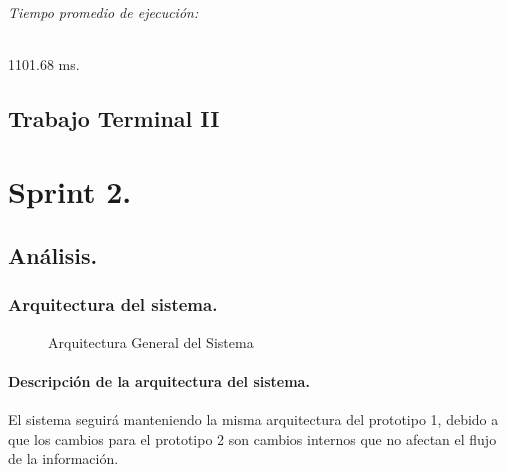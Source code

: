 \documentclass[12pt, a4paper, titlepage]{report}
\begin{document}
	            \paragraph{Tiempo promedio de ejecución: } 1101.68 ms.\\
   \textcolor{guindapoli}{\part{Trabajo Terminal II}}
   
	            
	\part{Sprint 2.}
	\chapter{\textcolor{azulescom}{Análisis.}}
    	    
    	\section{Arquitectura del sistema.}
            \begin{figure}[H]
        		\begin{center}
        		\caption{Arquitectura General del Sistema}
	            \end{center}
	        \end{figure}    
	        \subsection{Descripci\'on de la arquitectura del sistema.}
	            El sistema seguirá manteniendo la misma arquitectura del prototipo 1, debido a que los cambios para el prototipo 2 son cambios internos que no afectan el flujo de la información.
	            
\end{document}
